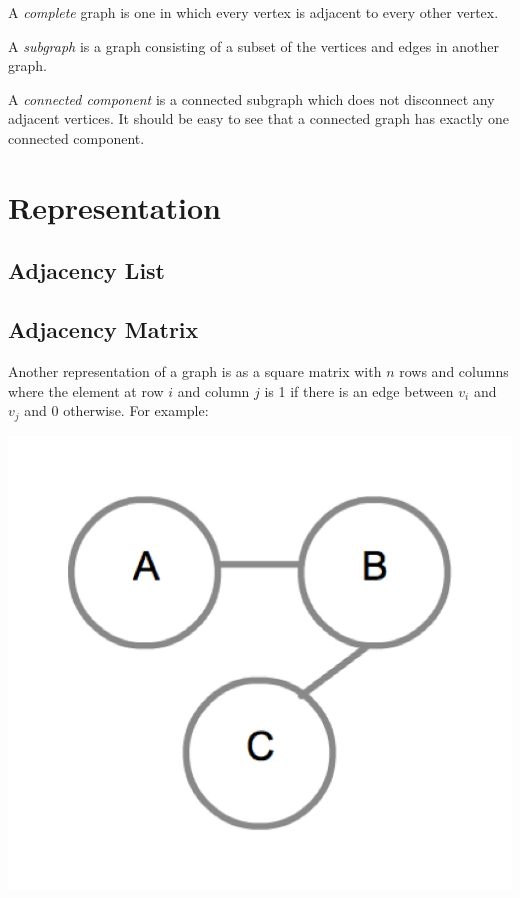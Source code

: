 A \emph{complete} graph is one in which every vertex is adjacent to
every other vertex.

A \emph{subgraph} is a graph consisting of a subset of the vertices
and edges in another graph.

A \emph{connected component} is a connected subgraph which does
not disconnect any adjacent vertices.  It should be easy to see that a
connected graph has exactly one connected component.

\section{Representation}

\subsection{Adjacency List}

\subsection{Adjacency Matrix}

Another representation of a graph is as a square matrix with $n$ rows
and columns where the element at row $i$ and column $j$ is 1 if there
is an edge between $v_i$ and $v_j$ and 0 otherwise.  For example:

{
  \includegraphics[scale=0.2]{SimpleGraph}
  \label{fig:SimpleGraph}
}

